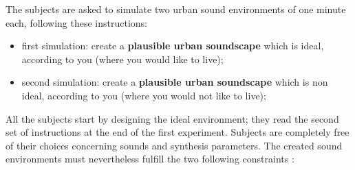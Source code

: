\documentclass[12pt]{elsarticle}
\begin{document}

The subjects are asked to simulate two urban sound environments of one minute each, following these instructions:


\begin{itemize}
\item  first simulation: create a \textbf{plausible urban soundscape} which is ideal, according to you (where you would like to live);
\item second simulation: create a \textbf{plausible urban soundscape} which is non ideal, according to you (where you would not like to live);
\end{itemize}



All the subjects start by designing the ideal environment; they read the second set of instructions at the end of the first experiment. Subjects are completely free of their choices concerning sounds and synthesis parameters. The created sound environments must nevertheless fulfill the two following constraints :

\end{document}
